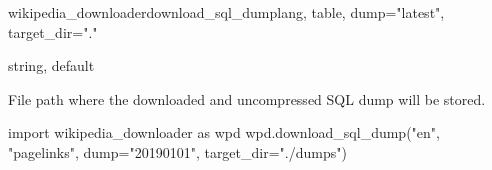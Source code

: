 \begin{functiondoc}{wikipedia\_downloader}{download\_sql\_dump}{lang, table, dump="latest", target\_dir="."}
\begin{functionparameters}
                    \item[target\_dir] string, default 
                    
                    File path where the downloaded and uncompressed SQL dump will be stored.
                \end{functionparameters}
                
                \begin{functionoutput}
                \end{functionoutput}
                
                \begin{functionexample}
import wikipedia_downloader as wpd
wpd.download_sql_dump("en", "pagelinks",
                      dump="20190101",
                      target_dir="./dumps")
                \end{functionexample}
            \end{functiondoc}

